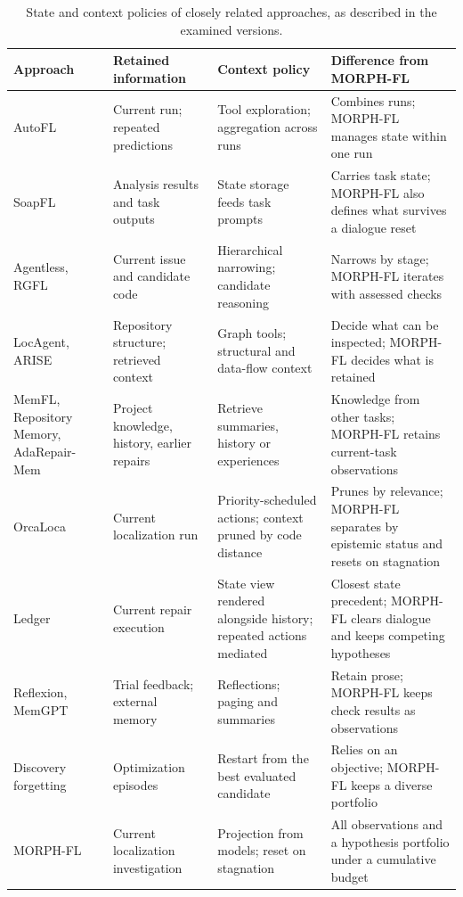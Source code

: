 \documentclass[a4paper,fleqn]{cas-sc}
\newcommand{\tool}{MORPH-FL}
\begin{document}
\begin{table}[width=\FullWidth,pos=!htbp]
\caption{State and context policies of closely related approaches, as described in the examined versions.}\label{tab:closest}
\centering\small\setlength{\tabcolsep}{3pt}
\renewcommand{\arraystretch}{1.12}
\begin{tabular}{@{}>{\raggedright\arraybackslash}p{}>{\raggedright\arraybackslash}p{}>{\raggedright\arraybackslash}p{}>{\raggedright\arraybackslash}p{}@{}}\toprule
Approach & Retained information & Context policy & Difference from \tool{}\\\midrule
AutoFL~\citep{autofl2024} & Current run; repeated predictions & Tool exploration; aggregation across runs & Combines runs; \tool{} manages state within one run\\
SoapFL~\citep{soapfl2025} & Analysis results and task outputs & State storage feeds task prompts & Carries task state; \tool{} also defines what survives a dialogue reset\\
Agentless, RGFL~\citep{agentless2025,rgfl2026} & Current issue and candidate code & Hierarchical narrowing; candidate reasoning & Narrows by stage; \tool{} iterates with assessed checks\\
LocAgent, ARISE~\citep{locagent2025,arise2026} & Repository structure; retrieved context & Graph tools; structural and data-flow context & Decide what can be inspected; \tool{} decides what is retained\\
MemFL, Repository Memory, AdaRepair-Mem~\citep{memfl2025,repomem2026,adarepair2026} & Project knowledge, history, earlier repairs & Retrieve summaries, history or experiences & Knowledge from other tasks; \tool{} retains current-task observations\\
OrcaLoca~\citep{orcaloca2025} & Current localization run & Priority-scheduled actions; context pruned by code distance & Prunes by relevance; \tool{} separates by epistemic status and resets on stagnation\\
Ledger~\citep{ledger2026} & Current repair execution & State view rendered alongside history; repeated actions mediated & Closest state precedent; \tool{} clears dialogue and keeps competing hypotheses\\
Reflexion, MemGPT~\citep{reflexion2023,memgpt2024} & Trial feedback; external memory & Reflections; paging and summaries & Retain prose; \tool{} keeps check results as observations\\
Discovery forgetting~\citep{forgetting2026} & Optimization episodes & Restart from the best evaluated candidate & Relies on an objective; \tool{} keeps a diverse portfolio\\
\tool{} & Current localization investigation & Projection from models; reset on stagnation & All observations and a hypothesis portfolio under a cumulative budget\\
\bottomrule\end{tabular}
\end{table}
\end{document}
